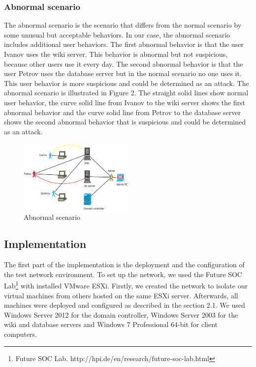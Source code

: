 \subsubsection{Abnormal scenario}
The abnormal scenario is the scenario that differs from the normal scenario by some unusual but acceptable behaviors. In our case, the abnormal scenario includes additional user behaviors. The first abnormal behavior is that the user Ivanov uses the wiki server. This behavior is abnormal but not suspicious, because other users use it every day. The second abnormal behavior is that the user Petrov uses the database server but in the normal scenario no one uses it. This user behavior is more suspicious and could be determined as an attack. The abnormal scenario is illustrated in Figure 2. The straight solid lines show normal user behavior, the curve solid line from Ivanov to the wiki server shows the first abnormal behavior and the curve solid line from Petrov to the database server shows the second abnormal behavior that is suspicious and could be determined as an attack. 
\begin{figure}[ht!]
\centering
\includegraphics[width=0.5\textwidth]{figures/scenario_abnormal.png}
\caption{Abnormal scenario}
\label{overflow}
\end{figure}

\subsection{Implementation}
The first part of the implementation is the deployment and the configuration of the test network environment. To set up the network, we used the Future SOC Lab\footnote{Future SOC Lab. http://hpi.de/en/research/future-soc-lab.html} with installed VMware ESXi. Firstly, we created the network to isolate our virtual machines from others hosted on the same ESXi server. Afterwards, all machines were deployed and configured as described in the section 2.1. We used Windows Server 2012 for the domain controller, Windows Server 2003 for the wiki and database servers and Windows 7 Professional 64-bit for client computers. 

